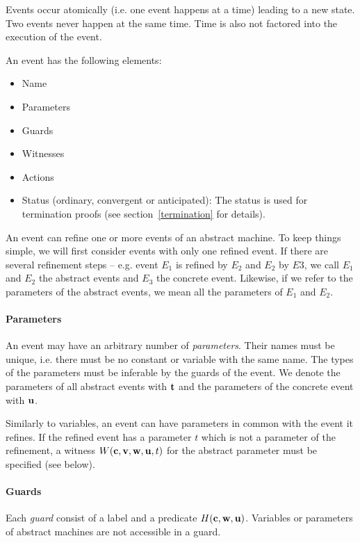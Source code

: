 Events occur atomically (i.e. one event happens at a time) leading to a new state.
Two events never happen at the same time. Time is also not factored into the execution of the event.

An event has the following elements:
\begin{itemize}
\item Name
\item Parameters
\item Guards
\item Witnesses
\item Actions
\item Status (ordinary, convergent or anticipated): The status is used
  for termination proofs (see section~\ref{termination} for details).
\end{itemize}

An event can refine one or more events of an abstract machine. To keep things simple, we will
  first consider events with only one refined event.
If there are several refinement steps -- e.g. event $E_1$ is refined by $E_2$ and $E_2$ by
  $E3$, we call $E_1$ and $E_2$ the abstract events and $E_3$ the concrete event.
Likewise, if we refer to the parameters of the abstract events, we mean all the parameters
  of $E_1$ and $E_2$.

\paragraph{Parameters}
An event may have an arbitrary number of \emph{parameters}. Their names must be unique, i.e. there must be no constant or variable with the same name.
The types of the parameters must be inferable by the guards of the event.
We denote the parameters of all abstract events with $\mathbf{t}$ and the
parameters of the concrete event with $\mathbf{u}$.

Similarly to variables, an event can have parameters in common with the event it refines.
If the refined event has a parameter $t$ which is not a parameter of the refinement, 
a witness $W(\mathbf{c},{\mathbf{v},\mathbf{w}},\mathbf{u},t)$ for the abstract parameter must be specified (see below).

\paragraph{Guards}
Each \emph{guard} consist of a label and a predicate $H(\mathbf{c},\mathbf{w},\mathbf{u})$.
Variables or parameters of abstract machines are not accessible in a guard.

